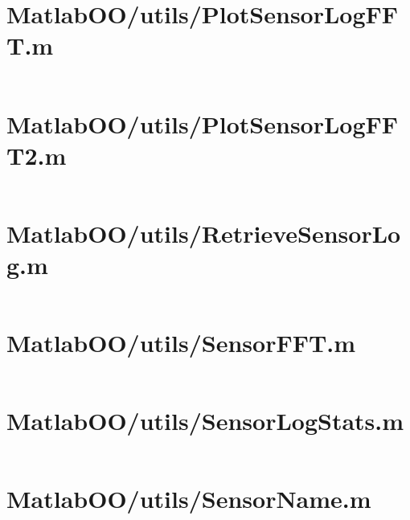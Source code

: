 \pagebreak
\section{MatlabOO/utils/PlotSensorLogFFT.m}\label{code:MatlabOO/utils/PlotSensorLogFFT.m}
\inputminted[linenos,fontsize=\scriptsize]{matlab}{/home/dcouture/git/mathyourlife/TSatPy/beta_versions/matlab_object_oriented/utils/PlotSensorLogFFT.m}

\pagebreak
\section{MatlabOO/utils/PlotSensorLogFFT2.m}\label{code:MatlabOO/utils/PlotSensorLogFFT2.m}
\inputminted[linenos,fontsize=\scriptsize]{matlab}{/home/dcouture/git/mathyourlife/TSatPy/beta_versions/matlab_object_oriented/utils/PlotSensorLogFFT2.m}

\pagebreak
\section{MatlabOO/utils/RetrieveSensorLog.m}\label{code:MatlabOO/utils/RetrieveSensorLog.m}
\inputminted[linenos,fontsize=\scriptsize]{matlab}{/home/dcouture/git/mathyourlife/TSatPy/beta_versions/matlab_object_oriented/utils/RetrieveSensorLog.m}

\pagebreak
\section{MatlabOO/utils/SensorFFT.m}\label{code:MatlabOO/utils/SensorFFT.m}
\inputminted[linenos,fontsize=\scriptsize]{matlab}{/home/dcouture/git/mathyourlife/TSatPy/beta_versions/matlab_object_oriented/utils/SensorFFT.m}

\pagebreak
\section{MatlabOO/utils/SensorLogStats.m}\label{code:MatlabOO/utils/SensorLogStats.m}
\inputminted[linenos,fontsize=\scriptsize]{matlab}{/home/dcouture/git/mathyourlife/TSatPy/beta_versions/matlab_object_oriented/utils/SensorLogStats.m}

\pagebreak
\section{MatlabOO/utils/SensorName.m}\label{code:MatlabOO/utils/SensorName.m}
\inputminted[linenos,fontsize=\scriptsize]{matlab}{/home/dcouture/git/mathyourlife/TSatPy/beta_versions/matlab_object_oriented/utils/SensorName.m}

